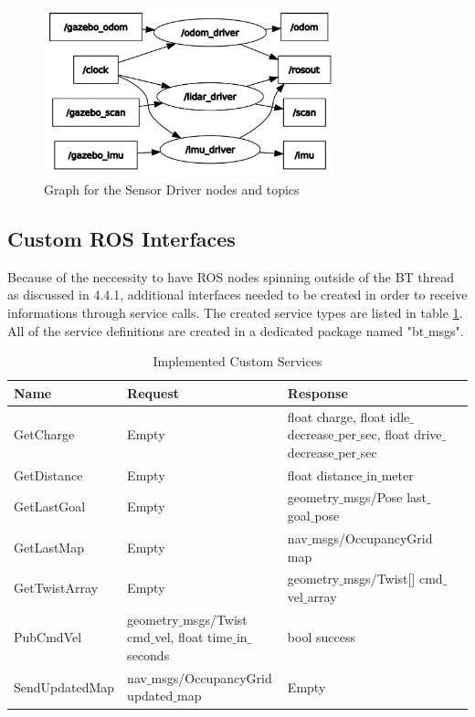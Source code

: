 \begin{center}
\begin{figure}[ht]
	\label{fig:rqt_graph}
	\includegraphics[width=0.75\textwidth]{images/rqt_graph_sensor_drivers.png}
	\caption{Graph for the Sensor Driver nodes and topics}
\end{figure}
\end{center}

\subsection{Custom ROS Interfaces}

Because of the neccessity to have ROS nodes spinning outside of the BT thread as discussed in 4.4.1, additional interfaces needed to be created in order to receive informations through service calls. The created service types are listed in table \ref{tab:custom_interfaces}. All of the service definitions are created in a dedicated package named "bt$\_$msgs". 

\begin{table}[ht]
	\label{tab:custom_interfaces}
	\caption{Implemented Custom Services}
	\begin{tabular}{ | m{} | m{}| m{} | m{} |} 
  	\hline
  	Name & Request & Response \\ 
  	\hline
  	GetCharge & Empty & float charge, float idle$\_$decrease$\_$per$\_$sec, float drive$\_$decrease$\_$per$\_$sec \\
  	\hline
  	GetDistance & Empty & float distance$\_$in$\_$meter\\ 
  	\hline
  	GetLastGoal & Empty & geometry$\_$msgs/Pose last$\_$goal$\_$pose \\ 
  	\hline
  	GetLastMap & Empty & nav$\_$msgs/OccupancyGrid map \\
  	\hline
  	GetTwistArray & Empty & geometry$\_$msgs/Twist[] cmd$\_$vel$\_$array\\
  	\hline  	
  	PubCmdVel & geometry$\_$msgs/Twist cmd$\_$vel, float time$\_$in$\_$seconds & bool success \\
  	\hline
  	SendUpdatedMap & nav$\_$msgs/OccupancyGrid updated$\_$map & Empty \\
  	\hline
	\end{tabular}
\end{table}





